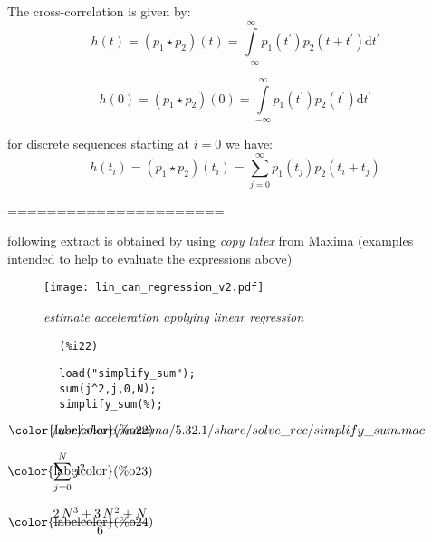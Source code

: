 The cross-correlation is given by:
\begin{equation}
h(t)=(p_1\star p_2)(t)=\int\limits_{-\infty}^{\infty} p_1(t^\prime)p_2(t+t^\prime) \mathrm{d}t^\prime
\end{equation}

\begin{equation}
h(0)=(p_1\star p_2)(0)=\int\limits_{-\infty}^{\infty} p_1(t^\prime)p_2(t^\prime) \mathrm{d}t^\prime
\end{equation}

for discrete sequences starting at $i=0$ we have:
\begin{equation}
\boxed{
h(t_i)=(p_1\star p_2)(t_i)=\sum\limits_{j=0}^{\infty} p_1(t_j)p_2(t_i+t_j)
}
\end{equation}


======================


following extract is obtained by using \emph{copy latex} from Maxima (examples intended to help to evaluate the expressions above)
\begin{figure}
	\centerline{
		\texttt{[image: lin\_can\_regression\_v2.pdf]}
	}
	\caption{\emph{estimate acceleration applying linear regression}}
	\label {fig:lcregression}
\end{figure}

\noindent
\begin{minipage}[t]{8ex}{\color{red}\bf
		\begin{verbatim}
		(%i22) 
		\end{verbatim}
	}
\end{minipage}
\begin{minipage}[t]{\textwidth}{\color{blue}
		\begin{verbatim}
		load("simplify_sum");
		sum(j^2,j,0,N);
		simplify_sum(%);
		\end{verbatim}
	}
\end{minipage}


\begin{math}\displaystyle
	\parbox{8ex}{\color{labelcolor}(\%o22) }
	/usr/share/maxima/5.32.1/share/solve\_rec/simplify\_sum.mac
\end{math}

\begin{math}\displaystyle
	\parbox{8ex}{\color{labelcolor}(\%o23) }
	\sum_{j=0}^{N}{j}^{2}
\end{math}

\begin{math}\displaystyle
	\parbox{8ex}{\color{labelcolor}(\%o24) }
	\frac{2\,{N}^{3}+3\,{N}^{2}+N}{6}
\end{math}

